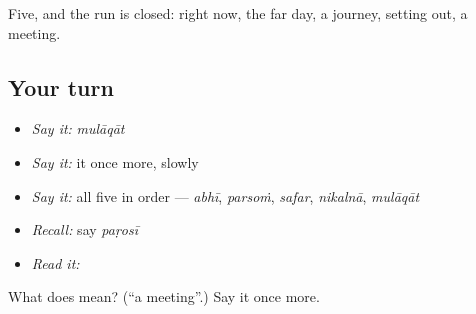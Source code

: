 \begin{grammarlens}[title={What you've built}]
Five, and the run is closed: right now, the far day, a journey, setting out, a meeting.
\end{grammarlens}

\subsection*{Your turn}
\begin{itemize}
\raggedright
  \item \emph{Say it:} \emph{mulāqāt}
  \item \emph{Say it:} it once more, slowly
  \item \emph{Say it:} all five in order — \emph{abhī}, \emph{parsoṁ}, \emph{safar}, \emph{nikalnā}, \emph{mulāqāt}
  \item \emph{Recall:} say \emph{paṛosī}
  \item \emph{Read it:} \textbf{}
\end{itemize}

\begin{tcolorbox}[breakable,colback=teal!4,colframe=teal!35!black,title={Before you move on}]
What does  mean? (\textquotedblleft{}a meeting\textquotedblright{}.) Say it once more.
\end{tcolorbox}
